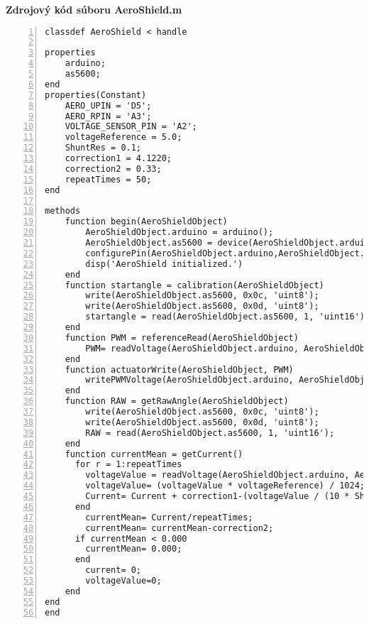 \LARGE\bf{Zdrojový kód súboru AeroShield.m}
\label{AeroShield.m}
\vspace{1cm}
\begin{lstlisting}[numbers=left,basicstyle=\scriptsize,caption={Zdrojový kód súboru AeroShield.m.},captionpos=b]	
classdef AeroShield < handle

properties
	arduino;
	as5600;
end
properties(Constant)
	AERO_UPIN = 'D5'; 
	AERO_RPIN = 'A3';
	VOLTAGE_SENSOR_PIN = 'A2';
	voltageReference = 5.0;
	ShuntRes = 0.1;
	correction1 = 4.1220;
	correction2 = 0.33;
	repeatTimes = 50;
end

methods
	function begin(AeroShieldObject) 
		AeroShieldObject.arduino = arduino();
		AeroShieldObject.as5600 = device(AeroShieldObject.arduino,'I2CAddress',0x36); 
		configurePin(AeroShieldObject.arduino,AeroShieldObject.AERO_UPIN, 'DigitalOutput') 
		disp('AeroShield initialized.') 
	end
	function startangle = calibration(AeroShieldObject)
		write(AeroShieldObject.as5600, 0x0c, 'uint8');
		write(AeroShieldObject.as5600, 0x0d, 'uint8');
		startangle = read(AeroShieldObject.as5600, 1, 'uint16');
	end
	function PWM = referenceRead(AeroShieldObject)
		PWM= readVoltage(AeroShieldObject.arduino, AeroShieldObject.AERO_RPIN);
	end
	function actuatorWrite(AeroShieldObject, PWM) 
		writePWMVoltage(AeroShieldObject.arduino, AeroShieldObject.AERO_UPIN, PWM);
	end
	function RAW = getRawAngle(AeroShieldObject)
		write(AeroShieldObject.as5600, 0x0c, 'uint8');
		write(AeroShieldObject.as5600, 0x0d, 'uint8');
		RAW = read(AeroShieldObject.as5600, 1, 'uint16');
	end
	function currentMean = getCurrent()
	  for r = 1:repeatTimes
		voltageValue = readVoltage(AeroShieldObject.arduino, AeroShieldObject.VOLTAGE_SENSOR_PIN);
		voltageValue= (voltageValue * voltageReference) / 1024;
		Current= Current + correction1-(voltageValue / (10 * ShuntRes)); 
	  end
		currentMean= Current/repeatTimes;
		currentMean= currentMean-correction2;
	  if currentMean < 0.000 
		currentMean= 0.000; 
	  end
		current= 0;  
		voltageValue=0;   
	end 
end
end
\end{lstlisting}